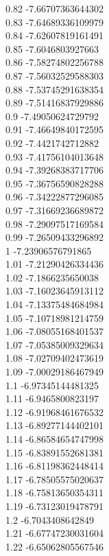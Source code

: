 {0.82	-7.66707363644302\\
0.83	-7.64689336109979\\
0.84	-7.62607819161491\\
0.85	-7.6046803927663\\
0.86	-7.58274802256788\\
0.87	-7.56032529588303\\
0.88	-7.53745291638354\\
0.89	-7.51416837929886\\
0.9	-7.49050624729792\\
0.91	-7.46649840172595\\
0.92	-7.4421742712882\\
0.93	-7.41756104013648\\
0.94	-7.39268383717706\\
0.95	-7.36756590828288\\
0.96	-7.34222877296085\\
0.97	-7.31669236689872\\
0.98	-7.29097517169584\\
0.99	-7.26509433296892\\
1	-7.23906576791865\\
1.01	-7.21290426334436\\
1.02	-7.1866235650038\\
1.03	-7.16023645913112\\
1.04	-7.13375484684984\\
1.05	-7.10718981214759\\
1.06	-7.08055168401537\\
1.07	-7.05385009329634\\
1.08	-7.02709402473619\\
1.09	-7.00029186467949\\
1.1	-6.97345144481325\\
1.11	-6.9465800823197\\
1.12	-6.91968461676532\\
1.13	-6.89277144402101\\
1.14	-6.86584654747998\\
1.15	-6.83891552681381\\
1.16	-6.81198362448414\\
1.17	-6.78505575020637\\
1.18	-6.75813650354311\\
1.19	-6.73123019478791\\
1.2	-6.7043408642849\\
1.21	-6.67747230031604\\
1.22	-6.65062805567546\\
}
